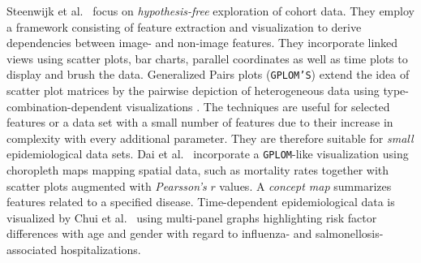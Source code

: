 \documentclass[journal]{style/vgtc} 			          %
\begin{document}
Steenwijk et al.~\cite{Steenwijk} focus on \emph{hypothesis-free} exploration of cohort data.
They employ a framework consisting of feature extraction and visualization to derive dependencies between image- and non-image features.
They incorporate linked views using scatter plots, bar charts, parallel coordinates as well as time plots to display and brush the data.
Generalized Pairs plots (\texttt{GPLOM'S}) extend the idea of scatter plot matrices by the pairwise depiction of heterogeneous data using type-combination-dependent visualizations \cite{GPLOMS, Francois2013}.
The techniques are useful for selected features or a data set with a small number of features due to their increase in complexity with every additional parameter.
They are therefore suitable for \emph{small} epidemiological data sets.
Dai et al.~\cite{Dai2005} incorporate a \texttt{GPLOM}-like visualization using choropleth maps mapping spatial data, such as mortality rates together with scatter plots augmented with \emph{Pearsson's} $r$ values.
A \emph{concept map} summarizes features related to a specified disease.
Time-dependent epidemiological data is visualized by Chui et al.~\cite{Chui2011} using multi-panel graphs highlighting risk factor differences with age and gender with regard to influenza- and salmonellosis-associated hospitalizations.
\end{document}
